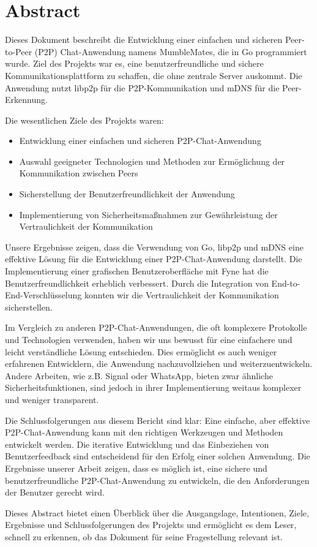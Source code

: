 \section*{Abstract}

Dieses Dokument beschreibt die Entwicklung einer einfachen und sicheren Peer-to-Peer (P2P) Chat-Anwendung namens MumbleMates, die in Go programmiert wurde. Ziel des Projekts war es, eine benutzerfreundliche und sichere Kommunikationsplattform zu schaffen, die ohne zentrale Server auskommt. Die Anwendung nutzt libp2p für die P2P-Kommunikation und mDNS für die Peer-Erkennung.

Die wesentlichen Ziele des Projekts waren:
\begin{itemize}
    \item Entwicklung einer einfachen und sicheren P2P-Chat-Anwendung
    \item Auswahl geeigneter Technologien und Methoden zur Ermöglichung der Kommunikation zwischen Peers
    \item Sicherstellung der Benutzerfreundlichkeit der Anwendung
    \item Implementierung von Sicherheitsmaßnahmen zur Gewährleistung der Vertraulichkeit der Kommunikation
\end{itemize}

Unsere Ergebnisse zeigen, dass die Verwendung von Go, libp2p und mDNS eine effektive Lösung für die Entwicklung einer P2P-Chat-Anwendung darstellt. Die Implementierung einer grafischen Benutzeroberfläche mit Fyne hat die Benutzerfreundlichkeit erheblich verbessert. Durch die Integration von End-to-End-Verschlüsselung konnten wir die Vertraulichkeit der Kommunikation sicherstellen.

Im Vergleich zu anderen P2P-Chat-Anwendungen, die oft komplexere Protokolle und Technologien verwenden, haben wir uns bewusst für eine einfachere und leicht verständliche Lösung entschieden. Dies ermöglicht es auch weniger erfahrenen Entwicklern, die Anwendung nachzuvollziehen und weiterzuentwickeln. Andere Arbeiten, wie z.B. Signal oder WhatsApp, bieten zwar ähnliche Sicherheitsfunktionen, sind jedoch in ihrer Implementierung weitaus komplexer und weniger transparent.

Die Schlussfolgerungen aus diesem Bericht sind klar: Eine einfache, aber effektive P2P-Chat-Anwendung kann mit den richtigen Werkzeugen und Methoden entwickelt werden. Die iterative Entwicklung und das Einbeziehen von Benutzerfeedback sind entscheidend für den Erfolg einer solchen Anwendung. Die Ergebnisse unserer Arbeit zeigen, dass es möglich ist, eine sichere und benutzerfreundliche P2P-Chat-Anwendung zu entwickeln, die den Anforderungen der Benutzer gerecht wird.

Dieses Abstract bietet einen Überblick über die Ausgangslage, Intentionen, Ziele, Ergebnisse und Schlussfolgerungen des Projekts und ermöglicht es dem Leser, schnell zu erkennen, ob das Dokument für seine Fragestellung relevant ist.

\newpage